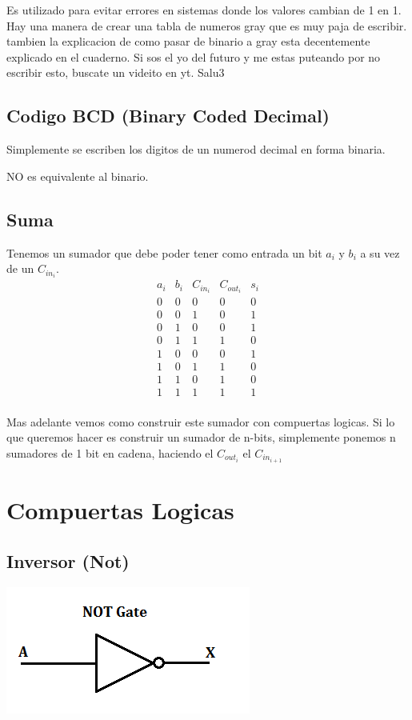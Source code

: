 \documentclass{report}
\begin{document}
Es utilizado para evitar errores en sistemas donde los valores cambian de 1 en 1.
Hay una manera de crear una tabla de numeros gray que es muy paja de escribir.
tambien la explicacion de como pasar de binario a gray esta decentemente explicado en el cuaderno.
Si sos el yo del futuro y me estas puteando por no escribir esto, buscate un videito en yt. Salu3


\section{Codigo BCD (Binary Coded Decimal)}

Simplemente se escriben los digitos de un numerod decimal en forma binaria.

NO es equivalente al binario.

\section{Suma}

Tenemos un sumador que debe poder tener como entrada un bit $a_i$ y $b_i$ a su vez de un $C_{in_i}$.
$$\begin{array}{ccc|cc}
		a_i & b_i & C_{in_i} & C_{out_i} & s_i \\ \hline
		0   & 0   & 0        & 0         & 0   \\
		0   & 0   & 1        & 0         & 1   \\
		0   & 1   & 0        & 0         & 1   \\
		0   & 1   & 1        & 1         & 0   \\
		1   & 0   & 0        & 0         & 1   \\
		1   & 0   & 1        & 1         & 0   \\
		1   & 1   & 0        & 1         & 0   \\
		1   & 1   & 1        & 1         & 1   \\
	\end{array}$$

Mas adelante vemos como construir este sumador con compuertas logicas.
Si lo que queremos hacer es construir un sumador de n-bits, simplemente ponemos n sumadores de 1 bit en cadena, haciendo el $C_{out_i}$ el $C_{in_{i+1}}$

\chapter{Compuertas Logicas}

\section{Inversor (Not)}
\includegraphics{../Assets/not_gate.png}
\end{document}
